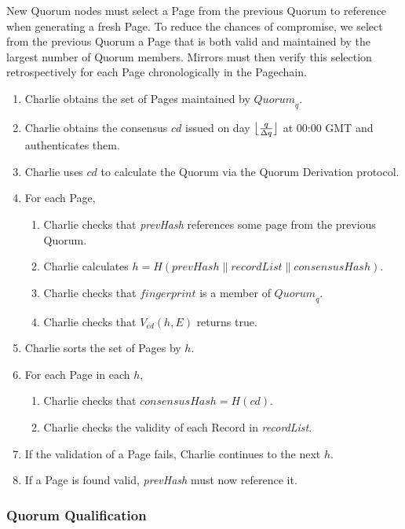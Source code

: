 \documentclass{sig-alternate}
\DeclarePairedDelimiter{\floor}{\lfloor}{\rfloor}
\newcommand*\concat{\mathbin{\|}}
\begin{document}
New Quorum nodes must select a Page from the previous Quorum to reference when generating a fresh Page. To reduce the chances of compromise, we select from the previous Quorum a Page that is both valid and maintained by the largest number of Quorum members. Mirrors must then verify this selection retrospectively for each Page chronologically in the Pagechain.

\begin{enumerate}
	\item Charlie obtains the set of Pages maintained by $ \mathit{Quorum}_{q} $.
	\item Charlie obtains the consensus $ \mathit{cd} $ issued on day $ \floor[\big]{\frac{q}{\Delta q}} $ at 00:00 GMT and authenticates them.
	\item Charlie uses $ \mathit{cd} $ to calculate the Quorum via the Quorum Derivation protocol.
	\item For each Page,
		\begin{enumerate}
			\item Charlie checks that \emph{prevHash} references some page from the previous Quorum.
			\item Charlie calculates $ h = H(\mathit{prevHash} \concat \mathit{recordList} \concat \mathit{consensusHash}) $.
			\item Charlie checks that $ \mathit{fingerprint} $ is a member of $ \mathit{Quorum}_{q} $.
			\item Charlie checks that $ V_{\mathit{ed}}(h, E) $ returns true.
		\end{enumerate}
	\item Charlie sorts the set of Pages by $ h $.
	\item For each Page in each $ h $,
		\begin{enumerate}
			\item Charlie checks that $ \mathit{consensusHash} = H(\mathit{cd}) $.
			\item Charlie checks the validity of each Record in \emph{recordList}.
		\end{enumerate}
	\item If the validation of a Page fails, Charlie continues to the next $ h $.
	\item If a Page is found valid, \emph{prevHash} must now reference it.
\end{enumerate}

\subsubsection{Quorum Qualification} %
\end{document}
